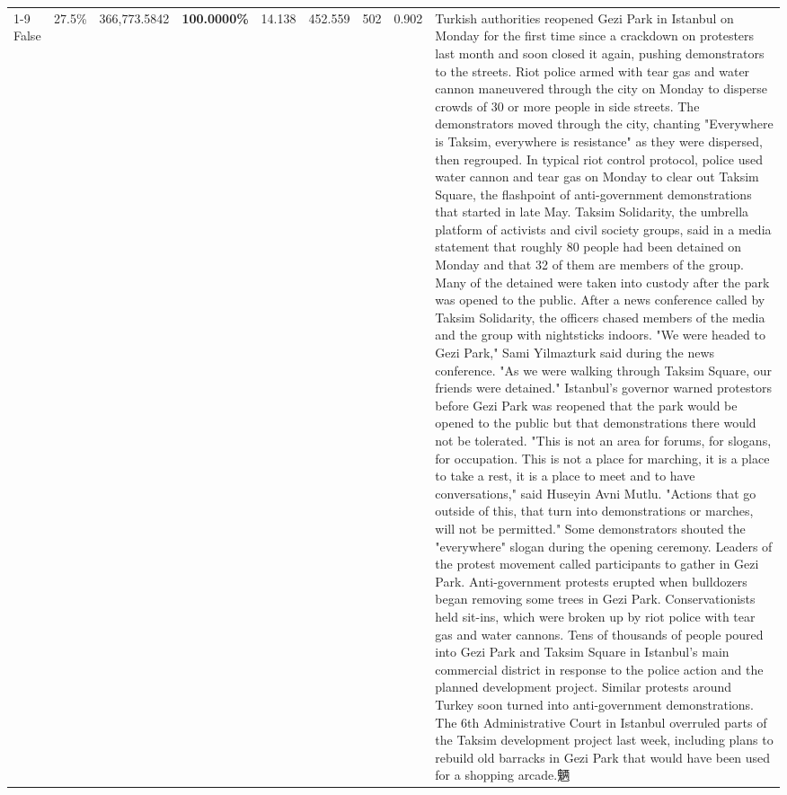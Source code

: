 \begin{table}[H]
\begin{tabular}{lllrlllll}
\cline{1-9}
False & 27.5\% & 366,773.5842 & \bfseries \color{red} 100.0000\% & 14.138 & 452.559 & 502 & 0.902 & Turkish authorities reopened Gezi Park in Istanbul on Monday for the first time since a crackdown on protesters last month and soon closed it again, pushing demonstrators to the streets. Riot police armed with tear gas and water cannon maneuvered through the city on Monday to disperse crowds of 30 or more people in side streets. The demonstrators moved through the city, chanting "Everywhere is Taksim, everywhere is resistance" as they were dispersed, then regrouped. In typical riot control protocol, police used water cannon and tear gas on Monday to clear out Taksim Square, the flashpoint of anti-government demonstrations that started in late May. Taksim Solidarity, the umbrella platform of activists and civil society groups, said in a media statement that roughly 80 people had been detained on Monday and that 32 of them are members of the group. Many of the detained were taken into custody after the park was opened to the public. After a news conference called by Taksim Solidarity, the officers chased members of the media and the group with nightsticks indoors. "We were headed to Gezi Park," Sami Yilmazturk said during the news conference. "As we were walking through Taksim Square, our friends were detained." Istanbul's governor warned protestors before Gezi Park was reopened that the park would be opened to the public but that demonstrations there would not be tolerated. "This is not an area for forums, for slogans, for occupation. This is not a place for marching, it is a place to take a rest, it is a place to meet and to have conversations," said Huseyin Avni Mutlu. "Actions that go outside of this, that turn into demonstrations or marches, will not be permitted." Some demonstrators shouted the "everywhere" slogan during the opening ceremony. Leaders of the protest movement called participants to gather in Gezi Park. Anti-government protests erupted when bulldozers began removing some trees in Gezi Park. Conservationists held sit-ins, which were broken up by riot police with tear gas and water cannons. Tens of thousands of people poured into Gezi Park and Taksim Square in Istanbul's main commercial district in response to the police action and the planned development project. Similar protests around Turkey soon turned into anti-government demonstrations. The 6th Administrative Court in Istanbul overruled parts of the Taksim development project last week, including plans to rebuild old barracks in Gezi Park that would have been used for a shopping arcade.魉 \\

\end{tabular}
\end{table}
